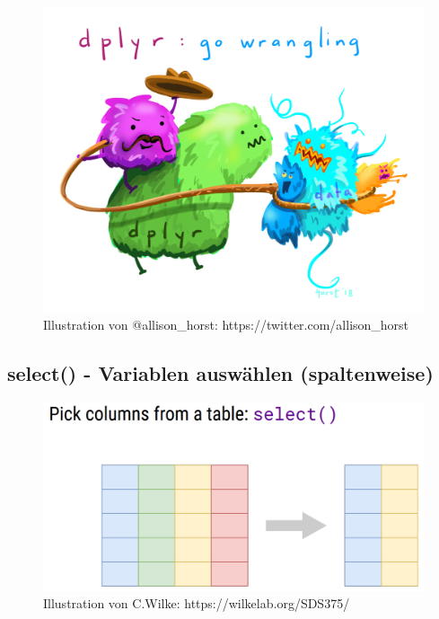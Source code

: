 \documentclass[
]{article}
\begin{document}
\begin{figure}

{\centering \includegraphics[width=26.57in]{images/032} 

}

\caption{Illustration von @allison_horst: https://twitter.com/allison_horst}\label{fig:unnamed-chunk-119}
\end{figure}

\hypertarget{select---variablen-auswuxe4hlen-spaltenweise}{%
\subsection{select() - Variablen auswählen (spaltenweise)}\label{select---variablen-auswuxe4hlen-spaltenweise}}

\begin{figure}

{\centering \includegraphics[width=16.99in]{images/037} 

}

\caption{Illustration von C.Wilke: https://wilkelab.org/SDS375/}\label{fig:unnamed-chunk-120}
\end{figure}
\end{document}
